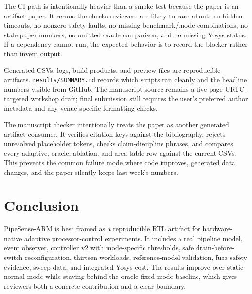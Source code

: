 \documentclass[conference]{IEEEtran}
\newcommand{\pipesense}{PipeSense-ARM}
\begin{document}
The CI path is intentionally heavier than a smoke test because the paper is an artifact paper. It reruns the checks reviewers are likely to care about: no hidden timeouts, no nonzero safety faults, no missing benchmark/mode combinations, no stale paper numbers, no omitted oracle comparison, and no missing Yosys status. If a dependency cannot run, the expected behavior is to record the blocker rather than invent output.

Generated CSVs, logs, build products, and preview files are reproducible artifacts. \texttt{results/SUMMARY.md} records which scripts ran cleanly and the headline numbers visible from GitHub. The manuscript source remains a five-page URTC-targeted workshop draft; final submission still requires the user's preferred author metadata and any venue-specific formatting checks.

The manuscript checker intentionally treats the paper as another generated artifact consumer. It verifies citation keys against the bibliography, rejects unresolved placeholder tokens, checks claim-discipline phrases, and compares every adaptive, oracle, ablation, and area table row against the current CSVs. This prevents the common failure mode where code improves, generated data changes, and the paper silently keeps last week's numbers.

\section{Conclusion}

\pipesense{} is best framed as a reproducible RTL artifact for hardware-native adaptive processor-control experiments. It includes a real pipeline model, event observer, controller v2 with mode-specific thresholds, safe drain-before-switch reconfiguration, thirteen workloads, reference-model validation, fuzz safety evidence, sweep data, and integrated Yosys cost. The results improve over static normal mode while staying behind the oracle fixed-mode baseline, which gives reviewers both a concrete contribution and a clear boundary.



\end{document}
